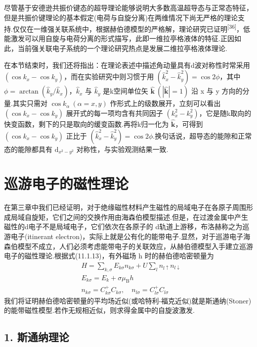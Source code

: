 尽管基于安德逊共振价键态的超导理论能够说明大多数高温超导态与正常态特征，但是共振价键理论的基本假定(电荷与自旋分离)在两维情况下尚无严格的理论支持.仅仅在一维强关联系统中，根据赫伯德模型的严格解，理论研究已证明\textsuperscript{[36]}，低能激发可以用自旋与电荷分离的形式描写，此即一维拉亭格液体的特征.正因如此，当前强关联电子系统的一个理论研究热点是发展二维拉亭格液体理论.

在本节结束时，我们还将指出：在理论表述中描述角动量具有d波对称性时常采用 $(\cos k_{x}-\cos k_{y})$，而在实验研究中则习惯于用 $(\hat{k}_{x}^{2}-\hat{k}_{y}^{2})=\cos 2\phi$，其中 $\phi=\arctan(\hat{k}_{y}/\hat{k}_{x})$，$\hat{k}_{x}$ 与 $\hat{k}_{y}$ 是k空间单位矢 $\hat{\boldsymbol{k}}\ (|\hat{\boldsymbol{k}}|=1)$ 沿 x 与 y 方向的分量.其实只需对 $\cos k_{\alpha}\ (\alpha=x,y)$ 作形式上的级数展开，立刻可以看出 $(\cos k_{x}-\cos k_{y})$ 展开式的每一项均含有共同因子 $(k_{x}^{2}-k_{y}^{2})$，它是随k取向的快变函数，剩下的只是取向的缓变函数.再将k归一化为 $\hat{\boldsymbol{k}}$，可得到 $(\cos k_{x}-\cos k_{y})$ 正比于 $(\hat{k}_{x}^{2}-\hat{k}_{y}^{2})=\cos 2\phi$.换句话说，超导态的能隙和正常态的能隙都具有 $\mathrm{d}_{x^{2}-y^{2}}$ 对称性，与实验观测结果一致.

\section{巡游电子的磁性理论}

在第三章中我们已经证明，对于绝缘磁性材料产生磁性的局域电子在各原子周围形成局域自旋矩，它们之间的交换作用由海森伯模型描述.但是，在过渡金属中产生磁性的d电子不是局域电子，它们依次在各原子的 d轨道上游移，布洛赫称之为巡游电子(itinerant electron)，实际上就是公有化的能带电子.显然，对于巡游电子海森伯模型不成立，人们必须考虑能带电子的关联效应，从赫伯德模型入手建立巡游电子的磁性理论.根据式(11.1.13)，有外磁场 h 时的赫伯德哈密顿量为
\begin{equation}
\begin{aligned}
  &H=\sum_{k,\sigma}E_{k\sigma}n_{k\sigma}+U\sum_{l}n_{l\uparrow}n_{l\downarrow}\\
  &E_{k\sigma}=E_{k}+\sigma\mu_{\mathrm{B}}h\\
  &n_{k\sigma}=C_{k\sigma}^{+}C_{k\sigma},\quad n_{l\sigma}=C_{l\sigma}^{+}C_{l\sigma}
\end{aligned}
\end{equation}
我们将证明赫伯德哈密顿量的平均场近似(或哈特利-福克近似)就是斯通纳(Stoner)的能带磁性模型.若作无规相近似，则求得金属中的自旋波激发.

\subsection*{1. 斯通纳理论}

